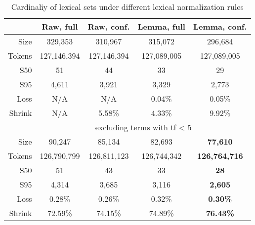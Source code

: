 
\begin{table}
    \begin{center}
        \begin{tabular}{ r | c | c | c | c }
                       & Raw, full   & Raw, conf.  & Lemma, full  & Lemma, conf.        \\
            \hline
            Size       & 329,353     & 310,967     & 315,072     & 296,684              \\
            Tokens     & 127,146,394 & 127,146,394 & 127,089,005 & 127,089,005          \\
            S50        & 51          & 44          & 33          & 29                   \\
            S95        & 4,611       & 3,921       & 3,329       & 2,773                \\
            Loss       & N/A         & N/A         & 0.04\%      & 0.05\%               \\
            Shrink     & N/A         & 5.58\%      & 4.33\%      & 9.92\%               \\
            \hline
            & \multicolumn{4}{c}{ \footnotesize{excluding terms with tf < 5}}           \\
            \hline
            Size       & 90,247      & 85,134      & 82,693      & \textbf{77,610}      \\
            Tokens     & 126,790,799 & 126,811,123 & 126,744,342 & \textbf{126,764,716} \\
            S50        & 51          & 43          & 33          & \textbf{28}          \\
            S95        & 4,314       & 3,685       & 3,116       & \textbf{2,605}       \\
            Loss       & 0.28\%      & 0.26\%      & 0.32\%      & \textbf{0.30\%}      \\
            Shrink     & 72.59\%     & 74.15\%     & 74.89\%     & \textbf{76.43\%}     \\
            \hline
        \end{tabular}
    \end{center}
    \caption{Cardinaliy of lexical sets under different lexical normalization rules}
    \label{tab:lexrules}
\end{table}
